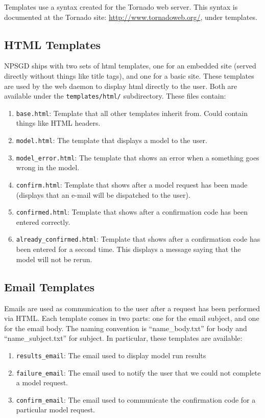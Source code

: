 \documentclass{article}
\newcommand{\mpath}[1]{\texttt{#1}}
\begin{document}
Templates use a syntax created for the Tornado web server. This syntax is
documented at the Tornado site: \url{http://www.tornadoweb.org/}, under
templates.

\subsection{HTML Templates}
NPSGD ships with two sets of html templates, one for an embedded site (served
directly without things like title tags), and one for a basic site. These
templates are used by the web daemon to display html directly to the user. Both are
available under the \mpath{templates/html/} subdirectory. These files contain:
\begin{enumerate}
    \item \texttt{base.html}: Template that all other templates inherit from.
    Could contain things like HTML headers.

    \item \texttt{model.html}: The template that displays a model to the user.

    \item \texttt{model\_error.html}: The template that shows an error when a
    something goes wrong in the model.

    \item \texttt{confirm.html}: Template that shows after a model request has
    been made (displays that an e-mail will be dispatched to the user).

    \item \texttt{confirmed.html}: Template that shows after a confirmation code
    has been entered correctly.

    \item \texttt{already\_confirmed.html}: Template that shows after a
    confirmation code has been entered for a second time. This displays a
    message saying that the model will not be rerun.
\end{enumerate}

\subsection{Email Templates}
Emails are used as communication to the user after a request has been performed
via HTML. Each template comes in two parts: one for the email subject, and one
for the email body. The naming convention is ``name\_body.txt'' for body and
``name\_subject.txt'' for subject. In particular, these templates are available:
\begin{enumerate}
    \item \texttt{results\_email}: The email used to display model run results
    \item \texttt{failure\_email}: The email used to notify the user that we
    could not complete a model request.
    \item \texttt{confirm\_email}: The email used to communicate the
    confirmation code for a particular model request.
\end{enumerate}
\end{document}
